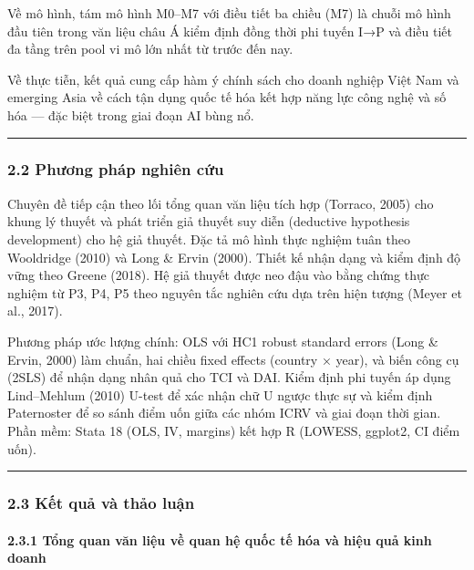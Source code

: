 \documentclass[12pt,a4paper]{article}
\begin{document}
Về mô hình, tám mô hình M0--M7 với điều tiết ba chiều (M7) là chuỗi mô
hình đầu tiên trong văn liệu châu Á kiểm định đồng thời phi tuyến I→P và
điều tiết đa tầng trên pool vi mô lớn nhất từ trước đến nay.

Về thực tiễn, kết quả cung cấp hàm ý chính sách cho doanh nghiệp Việt
Nam và emerging Asia về cách tận dụng quốc tế hóa kết hợp năng lực công
nghệ và số hóa --- đặc biệt trong giai đoạn AI bùng nổ.

\begin{center}\rule{0.5\linewidth}{0.5pt}\end{center}

\hypertarget{22-phux1b0ux1a1ng-phuxe1p-nghiuxean-cux1ee9u}{%
\subsubsection{2.2 Phương pháp nghiên
cứu}\label{22-phux1b0ux1a1ng-phuxe1p-nghiuxean-cux1ee9u}}

Chuyên đề tiếp cận theo lối tổng quan văn liệu tích hợp (Torraco, 2005)
cho khung lý thuyết và phát triển giả thuyết suy diễn (deductive
hypothesis development) cho hệ giả thuyết. Đặc tả mô hình thực nghiệm
tuân theo Wooldridge (2010) và Long \& Ervin (2000). Thiết kế nhận dạng
và kiểm định độ vững theo Greene (2018). Hệ giả thuyết được neo đậu vào
bằng chứng thực nghiệm từ P3, P4, P5 theo nguyên tắc nghiên cứu dựa trên
hiện tượng (Meyer et al., 2017).

Phương pháp ước lượng chính: OLS với HC1 robust standard errors (Long \&
Ervin, 2000) làm chuẩn, hai chiều fixed effects (country × year), và
biến công cụ (2SLS) để nhận dạng nhân quả cho TCI và DAI. Kiểm định phi
tuyến áp dụng Lind--Mehlum (2010) U-test để xác nhận chữ U ngược thực sự
và kiểm định Paternoster để so sánh điểm uốn giữa các nhóm ICRV và giai
đoạn thời gian. Phần mềm: Stata 18 (OLS, IV, margins) kết hợp R (LOWESS,
ggplot2, CI điểm uốn).

\begin{center}\rule{0.5\linewidth}{0.5pt}\end{center}

\hypertarget{23-kux1ebft-quux1ea3-vuxe0-thux1ea3o-luux1eadn}{%
\subsubsection{2.3 Kết quả và thảo
luận}\label{23-kux1ebft-quux1ea3-vuxe0-thux1ea3o-luux1eadn}}

\hypertarget{231-tux1ed5ng-quan-vux103n-liux1ec7u-vux1ec1-quan-hux1ec7-quux1ed1c-tux1ebf-huxf3a-vuxe0-hiux1ec7u-quux1ea3-kinh-doanh}{%
\paragraph{2.3.1 Tổng quan văn liệu về quan hệ quốc tế hóa và hiệu quả
kinh
doanh}\label{231-tux1ed5ng-quan-vux103n-liux1ec7u-vux1ec1-quan-hux1ec7-quux1ed1c-tux1ebf-huxf3a-vuxe0-hiux1ec7u-quux1ea3-kinh-doanh}}
\end{document}
